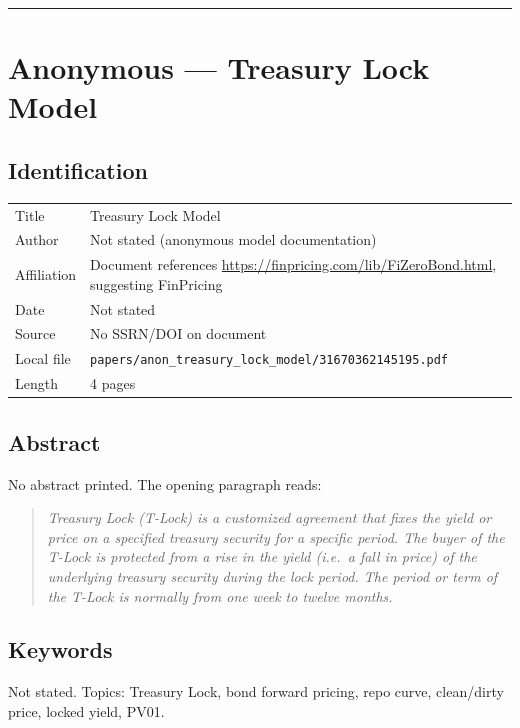 \documentclass[11pt,a4paper]{article}
\begin{document}
\bigskip\hrule\bigskip

\section{Anonymous --- Treasury Lock Model}
\label{bib:anon-tlock-model}

\subsection*{Identification}
\begin{tabular}{@{}p{3.5cm}p{11cm}@{}}
\toprule
Title           & Treasury Lock Model \\
Author          & Not stated (anonymous model documentation) \\
Affiliation     & Document references \url{https://finpricing.com/lib/FiZeroBond.html}, suggesting FinPricing \\
Date            & Not stated \\
Source          & No SSRN/DOI on document \\
Local file      & \texttt{papers/anon\_treasury\_lock\_model/31670362145195.pdf} \\
Length          & 4 pages \\
\bottomrule
\end{tabular}

\subsection*{Abstract}
No abstract printed. The opening paragraph reads:
\begin{quote}\itshape
Treasury Lock (T-Lock) is a customized agreement that fixes the yield
or price on a specified treasury security for a specific period.
The buyer of the T-Lock is protected from a rise in the yield (i.e.\
a fall in price) of the underlying treasury security during the lock
period. The period or term of the T-Lock is normally from one week to
twelve months.
\end{quote}

\subsection*{Keywords}
Not stated. Topics: Treasury Lock, bond forward pricing, repo curve,
clean/dirty price, locked yield, PV01.
\end{document}
